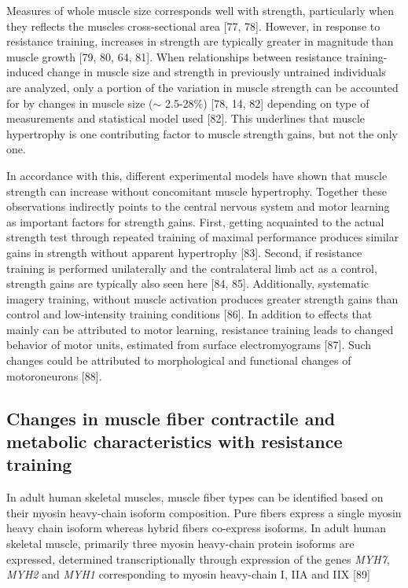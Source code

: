 \documentclass[twoside,10pt]{gihclass} %
\begin{document}
Measures of whole muscle size corresponds well with strength, particularly when they reflects the muscles cross-sectional area
{[}77, 78{]}.
However, in response to resistance training, increases in strength are typically greater in magnitude than muscle growth
{[}79, 80, 64, 81{]}.
When relationships between resistance training-induced change in muscle size and strength in previously untrained individuals are analyzed, only a portion of the variation in muscle strength can be accounted for by changes in muscle size (\(\sim\) 2.5-28\%)
{[}78, 14, 82{]}
depending on type of measurements and statistical model used
{[}82{]}.
This underlines that muscle hypertrophy is one contributing factor to muscle strength gains, but not the only one.

In accordance with this, different experimental models have shown that muscle strength can increase without concomitant muscle hypertrophy.
Together these observations indirectly points to the central nervous system and motor learning as important factors for strength gains.
First, getting acquainted to the actual strength test through repeated training of maximal performance produces similar gains in strength without apparent hypertrophy
{[}83{]}.
Second, if resistance training is performed unilaterally and the contralateral limb act as a control, strength gains are typically also seen here
{[}84, 85{]}.
Additionally, systematic imagery training, without muscle activation produces greater strength gains than control and low-intensity training conditions
{[}86{]}.
In addition to effects that mainly can be attributed to motor learning, resistance training leads to changed behavior of motor units, estimated from surface electromyograms
{[}87{]}.
Such changes could be attributed to morphological and functional changes of motoroneurons
{[}88{]}.

\hypertarget{changes-in-muscle-fiber-contractile-and-metabolic-characteristics-with-resistance-training}{%
\subsection{Changes in muscle fiber contractile and metabolic characteristics with resistance training}\label{changes-in-muscle-fiber-contractile-and-metabolic-characteristics-with-resistance-training}}

In adult human skeletal muscles, muscle fiber types can be identified based on their myosin heavy-chain isoform composition. Pure fibers express a single myosin heavy chain isoform whereas hybrid fibers co-express isoforms.
In adult human skeletal muscle, primarily three myosin heavy-chain protein isoforms are expressed, determined transcriptionally through expression of the genes \emph{MYH7}, \emph{MYH2} and \emph{MYH1} corresponding to myosin heavy-chain I, IIA and IIX
{[}89{]}
\end{document}
